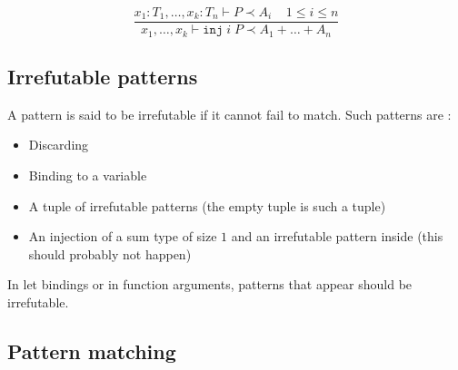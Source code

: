 \documentclass{scrartcl}
\begin{document}
\[
  \frac{x_1: T_1, \dots, x_k: T_n \vdash P \prec A_i
    \;\;\;\; 1 \leq i \leq n}
  {x_1, \dots, x_k \vdash \mathtt{inj}\;i\;P \prec A_1 + \dots + A_n}
\]

\subsection{Irrefutable patterns}
A pattern is said to be irrefutable if it cannot fail to match. Such patterns are :
\begin{itemize}
  \item Discarding
  \item Binding to a variable
  \item A tuple of irrefutable patterns (the empty tuple is such a tuple)
  \item An injection of a sum type of size $1$ and an irrefutable pattern inside
        (this should probably not happen)
\end{itemize}

In let bindings or in function arguments, patterns that appear should be irrefutable.

\subsection{Pattern matching}
\end{document}
